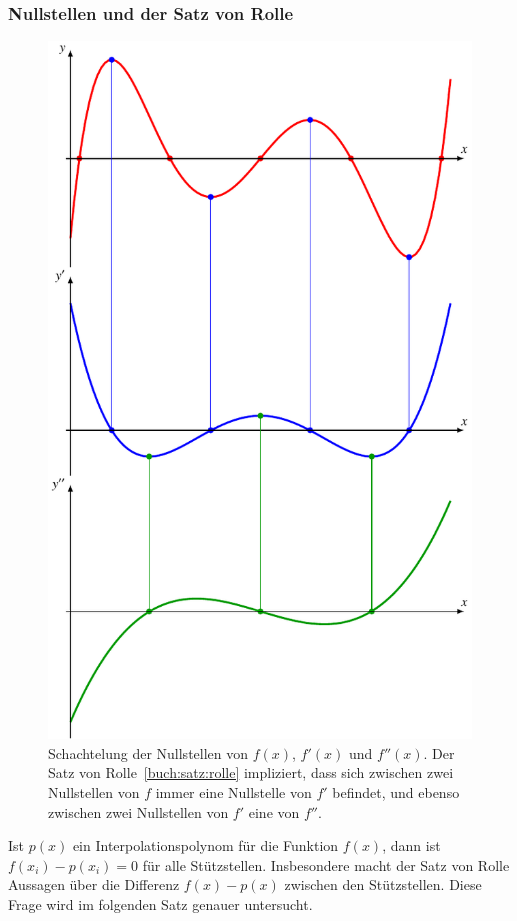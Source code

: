 \subsubsection{Nullstellen und der Satz von Rolle}
\begin{figure}
\centering
\includegraphics{chapters/30-interpolation/figures/nullstellen.pdf}
\caption{Schachtelung der Nullstellen von $f(x)$, $f'(x)$ und $f''(x)$.
Der Satz von Rolle~\ref{buch:satz:rolle} impliziert, dass sich zwischen zwei
Nullstellen von $f$ immer eine Nullstelle von $f'$ befindet, und
ebenso zwischen zwei Nullstellen von $f'$ eine von $f''$.
\label{buch:figure:nullstellen}}
\end{figure}
Ist $p(x)$ ein Interpolationspolynom für die Funktion $f(x)$, dann ist
$f(x_i)-p(x_i)=0$ für alle Stützstellen.
Insbesondere macht der Satz von Rolle Aussagen über 
die Differenz $f(x)-p(x)$ zwischen den Stützstellen.
Diese Frage wird im folgenden Satz genauer untersucht.

